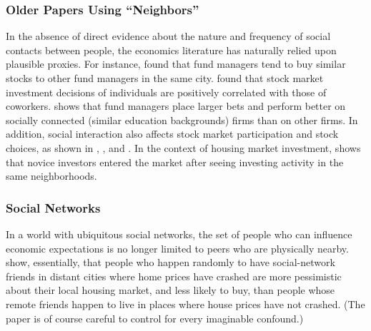 \subsubsection{Older Papers Using ``Neighbors''}

In the absence of direct evidence about the nature and frequency of social contacts between people, the economics literature has naturally relied upon plausible proxies.   For instance,  \href{http://www.columbia.edu/~hh2679/ThyNeighborJF.pdf}{\cite{hong2005thy}} found that fund managers tend to buy similar stocks to other fund managers in the same city. \href{https://github.com/iworld1991/EpiExp/blob/master/Literature/hvide2015social.pdf}{\cite{hvide2015social}} found that stock market investment decisions of individuals are positively correlated with those of coworkers.  \href{https://www.jstor.org/stable/10.1086/592415}{\cite{cohen2008small}} shows that fund managers place larger bets and perform better on socially connected (similar education backgrounds) firms than on other firms.  In addition, social interaction also affects stock market participation and stock choices, as shown in  \href{https://github.com/iworld1991/EpiExp/blob/master/Literature/hong2004social.pdf}{\cite{hong2004social}}, \href{https://onlinelibrary.wiley.com/doi/abs/10.1111/j.1540-6261.2008.01364.x}{\cite{brown2008neighbors}}, and \href{https://github.com/iworld1991/EpiExp/blob/master/Literature/ivkovic2007information.pdf}{\cite{ivkovic2007information}}. %
 In the context of housing market investment,
 \href{https://www.aeaweb.org/articles?id=10.1257/aer.20171611&from=f}{\cite{bayer2021speculative}} shows that novice investors entered the market after seeing investing activity in the same neighborhoods.

\subsubsection{Social Networks}

In a world with ubiquitous social networks, the set of people who can influence economic expectations is no longer limited to peers who are physically nearby.  \href{https://www.journals.uchicago.edu/doi/abs/10.1086/700073}{\cite{bailey2018economic}} show, essentially, that people who happen randomly to have social-network friends in distant cities where home prices have crashed are more pessimistic about their local housing market, and less likely to buy, than people whose remote friends happen to live in places where house prices have not crashed.  (The paper is of course careful to control for every imaginable confound.)

